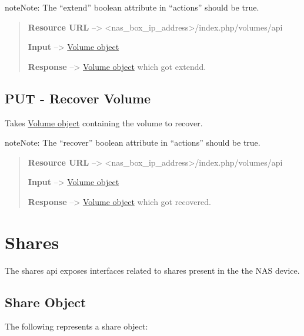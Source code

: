 \documentclass[letterpaper,10pt,english]{sphinxmanual}
\begin{document}
\begin{notice}{note}{Note:}
The ``extend'' boolean attribute in ``actions'' should be true.
\end{notice}
\begin{quote}

\textbf{Resource URL} --\textgreater{} \textless{}nas\_box\_ip\_address\textgreater{}/index.php/volumes/api

\textbf{Input} --\textgreater{} {\hyperref[volumes:volume-object-label]{Volume object}}

\textbf{Response} --\textgreater{} {\hyperref[volumes:volume-object-label]{Volume object}} which got extendd.
\end{quote}


\section{PUT - Recover Volume}
\label{volumes:put-recover-volume}
Takes {\hyperref[volumes:volume-object-label]{Volume object}} containing the volume to recover.

\begin{notice}{note}{Note:}
The ``recover'' boolean attribute in ``actions'' should be true.
\end{notice}
\begin{quote}

\textbf{Resource URL} --\textgreater{} \textless{}nas\_box\_ip\_address\textgreater{}/index.php/volumes/api

\textbf{Input} --\textgreater{} {\hyperref[volumes:volume-object-label]{Volume object}}

\textbf{Response} --\textgreater{} {\hyperref[volumes:volume-object-label]{Volume object}} which got recovered.
\end{quote}


\chapter{Shares}
\label{shares:shares-label}\label{shares::doc}\label{shares:shares}
The shares api exposes interfaces related to shares present in the the NAS device.


\section{Share Object}
\label{shares:share-object-label}\label{shares:share-object}
The following represents a share object:
\end{document}
